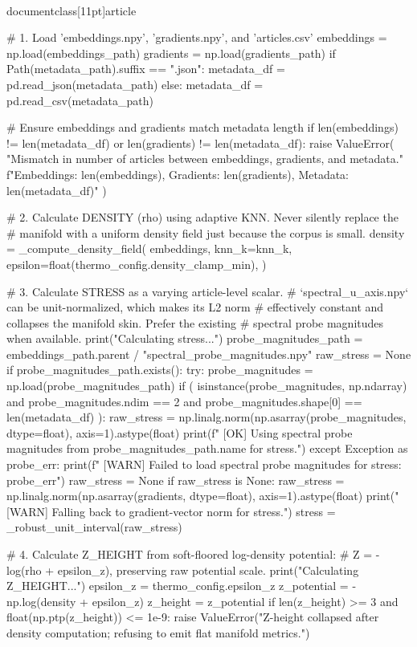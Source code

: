 \\documentclass[11pt]{article}
\begin{document}
\begin{CodeBlock}
    # 1. Load 'embeddings.npy', 'gradients.npy', and 'articles.csv'
    embeddings = np.load(embeddings_path)
    gradients = np.load(gradients_path)
    if Path(metadata_path).suffix == ".json":
        metadata_df = pd.read_json(metadata_path)
    else:
        metadata_df = pd.read_csv(metadata_path)

    # Ensure embeddings and gradients match metadata length
    if len(embeddings) != len(metadata_df) or len(gradients) != len(metadata_df):
        raise ValueError(
            "Mismatch in number of articles between embeddings, gradients, and metadata."
            f"Embeddings: {len(embeddings)}, Gradients: {len(gradients)}, Metadata: {len(metadata_df)}"
        )

    # 2. Calculate DENSITY (rho) using adaptive KNN. Never silently replace the
    # manifold with a uniform density field just because the corpus is small.
    density = _compute_density_field(
        embeddings,
        knn_k=knn_k,
        epsilon=float(thermo_config.density_clamp_min),
    )

    # 3. Calculate STRESS as a varying article-level scalar.
    # `spectral_u_axis.npy` can be unit-normalized, which makes its L2 norm
    # effectively constant and collapses the manifold skin. Prefer the existing
    # spectral probe magnitudes when available.
    print("Calculating stress...")
    probe_magnitudes_path = embeddings_path.parent / "spectral_probe_magnitudes.npy"
    raw_stress = None
    if probe_magnitudes_path.exists():
        try:
            probe_magnitudes = np.load(probe_magnitudes_path)
            if (
                isinstance(probe_magnitudes, np.ndarray)
                and probe_magnitudes.ndim == 2
                and probe_magnitudes.shape[0] == len(metadata_df)
            ):
                raw_stress = np.linalg.norm(np.asarray(probe_magnitudes, dtype=float), axis=1).astype(float)
                print(f"  [OK] Using spectral probe magnitudes from {probe_magnitudes_path.name} for stress.")
        except Exception as probe_err:
            print(f"  [WARN] Failed to load spectral probe magnitudes for stress: {probe_err}")
            raw_stress = None
    if raw_stress is None:
        raw_stress = np.linalg.norm(np.asarray(gradients, dtype=float), axis=1).astype(float)
        print("  [WARN] Falling back to gradient-vector norm for stress.")
    stress = _robust_unit_interval(raw_stress)

    # 4. Calculate Z_HEIGHT from soft-floored log-density potential:
    #    Z = -log(rho + epsilon_z), preserving raw potential scale.
    print("Calculating Z_HEIGHT...")
    epsilon_z = thermo_config.epsilon_z
    z_potential = -np.log(density + epsilon_z)
    z_height = z_potential
    if len(z_height) >= 3 and float(np.ptp(z_height)) <= 1e-9:
        raise ValueError("Z-height collapsed after density computation; refusing to emit flat manifold metrics.")


\end{CodeBlock}
\end{document}

